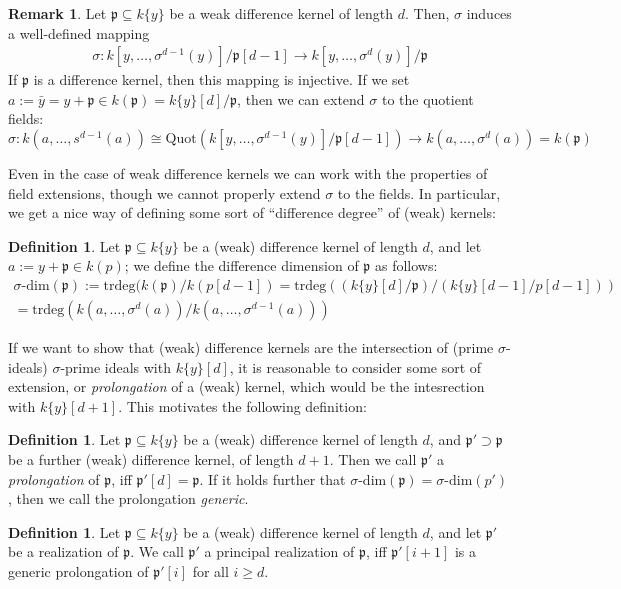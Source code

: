 \documentclass{article}
\def\p{\mathfrak{p}}
\def\s{\sigma}
\def\sdim{\sigma\text{-dim}}
\theoremstyle{definition}
\newtheorem{rem}[Satz]{Remark}
\newtheorem{defn}[Satz]{Definition}
\begin{document}
\begin{rem}\label{sigmawelldeffker}
Let $\p \subseteq k\{y\}$ be a weak difference kernel of length $d$. Then, $\s$ induces a well-defined mapping 
\begin{align*}
\s: k[y,\ldots,\s^{d-1}(y)]/\p[d-1] \rightarrow k[y,\ldots,\s^{d}(y)]/\p
\end{align*}
If $\p$ is a difference kernel, then this mapping is injective. 
If we set $a := \bar y = y + \p \in k(\p) = k\{y\}[d]/\p$, then we can extend $\s$ to the quotient fields:
\[ \s: k(a,\ldots,s^{d-1}(a)) \cong \text{Quot}(k[y,\ldots,\s^{d-1}(y)]/\p[d-1]) \rightarrow k(a,\ldots,\s^d(a)) = k(\p) \]
\end{rem}

Even in the case of weak difference kernels we can work with the properties of field extensions, though we cannot properly extend $\s$ to the fields.
 In particular, we get a nice way of defining some sort of ``difference degree'' of (weak) kernels:
\begin{defn}
Let $\p \subseteq k\{y\}$ be a (weak) difference kernel of length $d$, and let $a:= y + \p \in k(p)$; we define the difference dimension of $\p$ as follows:
\begin{align*} \sdim(\p) := \text{trdeg}(k(\p)/k(p[d-1]) = \text{trdeg}((k\{y\}[d]/\p)/(k\{y\}[d-1]/p[d-1])) \\  = \text{trdeg}(k(a,\ldots,\s^{d}(a))/k(a,\ldots,\s^{d-1}(a))) \end{align*}
\end{defn}\index{$\s$-dimension of a $\s$-kernel}

If we want to show that (weak) difference kernels are the intersection of (prime $\s$-ideals) $\s$-prime ideals with $k\{y\}[d]$,
it is reasonable to consider some sort of extension, or \emph{prolongation} of a (weak) kernel, which would be the intesrection with $k\{y\}[d+1]$. 
This motivates the following definition:

\begin{defn}
Let $\p \subseteq k\{y\}$ be a (weak) difference kernel of length $d$, and $\p' \supset \p$ be a further (weak) difference kernel, of length $d+1$.
Then we call $\p'$ a \emph{prolongation} of $\p$, iff $\p'[d] = \p$. If it holds further that $\sdim(\p) = \sdim(p')$, then we call the prolongation \emph{generic}.
\end{defn}

\begin{defn}
Let $\p \subseteq k\{y\}$ be a (weak) difference kernel of length $d$, and let $\p'$ be a realization of $\p$. We call $\p'$ a principal realization of $\p$, iff $\p'[i+1]$ is a generic prolongation of $\p'[i]$ for all $i \geq d$.
\end{defn}
\end{document}
